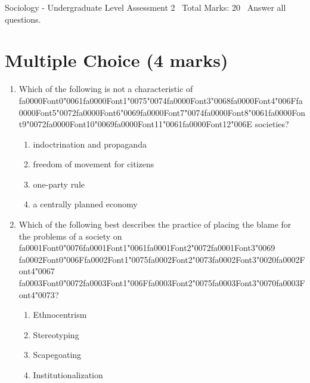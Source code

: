 \documentclass[12pt]{article}
\begin{document}
\begin{center}
Sociology - Undergraduate Level Assessment 2 \
Total Marks: 20 \
Answer all questions.
\end{center}

\section*{Multiple Choice (4 marks)}
\begin{enumerate}[label=\arabic*.]
\item Which of the following is not a characteristic of {\csname fa0000Font0\endcsname\char"0061}{\csname fa0000Font1\endcsname\char"0075}{\char"0074}{\csname fa0000Font3\endcsname\char"0068}{\csname fa0000Font4\endcsname\char"006F}{\csname fa0000Font5\endcsname\char"0072}{\csname fa0000Font6\endcsname\char"0069}{\csname fa0000Font7\endcsname\char"0074}{\csname fa0000Font8\endcsname\char"0061}{\csname fa0000Font9\endcsname\char"0072}{\csname fa0000Font10\endcsname\char"0069}{\csname fa0000Font11\endcsname\char"0061}{\csname fa0000Font12\endcsname\char"006E} societies?
\begin{enumerate}[label=(\alph*)]
    \item indoctrination and propaganda
    \item freedom of movement for citizens
    \item one-party rule
    \item a centrally planned economy
\end{enumerate}
\item Which of the following best describes the practice of placing the blame for the problems of a society on {\csname fa0001Font0\endcsname\char"0076}{\csname fa0001Font1\endcsname\char"0061}{\csname fa0001Font2\endcsname\char"0072}{\csname fa0001Font3\endcsname\char"0069} {\csname fa0002Font0\endcsname\char"006F}{\csname fa0002Font1\endcsname\char"0075}{\csname fa0002Font2\endcsname\char"0073}{\csname fa0002Font3\endcsname\char"0020}{\csname fa0002Font4\endcsname\char"0067} {\csname fa0003Font0\endcsname\char"0072}{\csname fa0003Font1\endcsname\char"006F}{\csname fa0003Font2\endcsname\char"0075}{\csname fa0003Font3\endcsname\char"0070}{\csname fa0003Font4\endcsname\char"0073}?
\begin{enumerate}[label=(\alph*)]
    \item Ethnocentrism
    \item Stereotyping
    \item Scapegoating
    \item Institutionalization
\end{enumerate}
\end{enumerate}
\end{document}
